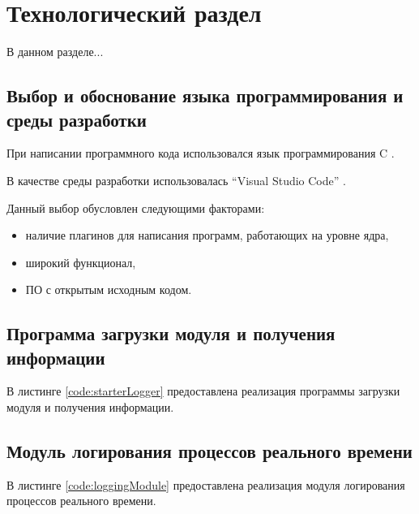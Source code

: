 \section{Технологический раздел}
В данном разделе...

\subsection{Выбор и обоснование языка программирования и среды разработки}
При написании программного кода использовался язык программирования C \cite{cLanguage}.

В качестве среды разработки использовалась ``Visual Studio Code'' \cite{VSCode}.

Данный выбор обусловлен следующими факторами:
\begin{itemize}
\item наличие плагинов для написания программ, работающих на уровне ядра,
\item широкий функционал,
\item ПО с открытым исходным кодом.
\end{itemize}

\subsection{Программа загрузки модуля и получения информации}
В листинге \ref{code:starterLogger} предоставлена реализация программы загрузки модуля и получения информации.


\subsection{Модуль логирования процессов реального времени}
В листинге \ref{code:loggingModule} предоставлена реализация модуля логирования процессов реального времени.
\newpage
{}

